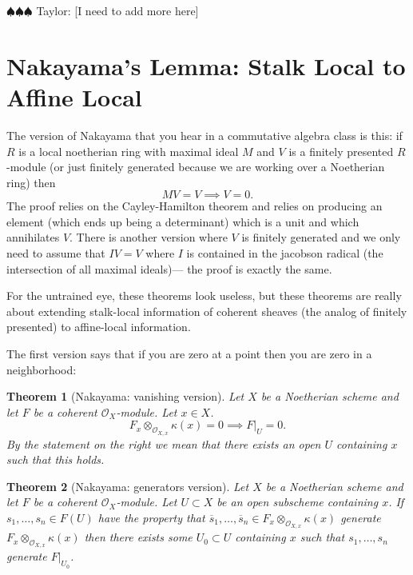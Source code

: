 \documentclass[12pt]{article}
\numberwithin{equation}{section}
\newtheorem{theorem}{Theorem}[subsection]
\theoremstyle{definition}
\theoremstyle{remark}
\newcommand{\Ocal}{\mathcal{O}}
\newcommand{\taylor}[1]{{\color{blue} \sf $\spadesuit\spadesuit\spadesuit$ Taylor: [#1]}}
\begin{document}
\taylor{I need to add more here}
\newpage
 
\appendix


 



\section{Nakayama's Lemma: Stalk Local to Affine Local}
The version of Nakayama that you hear in a commutative algebra class is this: if $R$ is a local noetherian ring with maximal ideal $M$ and $V$ is a finitely presented $R$-module (or just finitely generated because we are working over a Noetherian ring) then 
$$ MV =V \implies V =0. $$
The proof relies on the Cayley-Hamilton theorem and relies on producing an element (which ends up being a determinant) which is a unit and which annihilates $V$. 
There is another version where $V$ is finitely generated and we only need to assume that $IV=V$ where $I$ is contained in the jacobson radical (the intersection of all maximal ideals)--- the proof is exactly the same. 

For the untrained eye, these theorems look useless, but these theorems are really about extending stalk-local information of coherent sheaves (the analog of finitely presented) to affine-local information. 

The first version says that if you are zero at a point then you are zero in a neighborhood:
\begin{theorem}[Nakayama: vanishing version]\label{thm:nakayama-vanishing}
	Let $X$ be a Noetherian scheme and let $F$ be a coherent $\Ocal_X$-module. 
	Let $x\in X$. 
	$$F_x \otimes_{\Ocal_{X,x}}\kappa(x) =0 \implies F\vert_U =0. $$
	By the statement on the right we mean that there exists an open $U$ containing $x$ such that this holds.
\end{theorem}

\begin{theorem}[Nakayama: generators version]
	Let $X$ be a Noetherian scheme and let $F$ be a coherent $\Ocal_X$-module. 
	Let $U\subset X$ be an open subscheme containing $x$.
	If $s_1,\ldots,s_n \in F(U)$ have the property that $\overline{s}_1,\ldots,\overline{s}_n\in F_x\otimes_{\Ocal_{X,x}} \kappa(x)$ generate $F_x\otimes_{\Ocal_{X,x}} \kappa(x)$ then there exists some $U_0 \subset U$ containing $x$ such that $s_1,\ldots,s_n$ generate $F\vert_{U_0}$.
\end{theorem}
\end{document}
